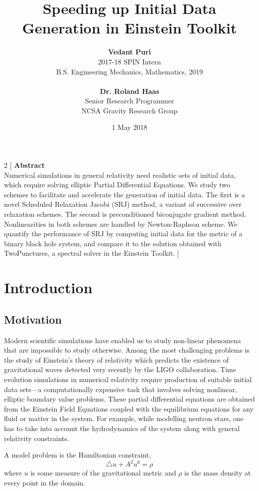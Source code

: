 \documentclass[12pt]{article}
\title{\bf Speeding up Initial Data Generation in Einstein Toolkit}
\author{\textbf{Vedant Puri}\\2017-18 SPIN Intern\\B.S. Engineering Mechanics, Mathematics, 2019
\\\\\textbf{Dr. Roland Haas}\\Senior Research Programmer\\NCSA Gravity Research Group}
\date{1 May 2018}
\begin{document}
\maketitle

\begin{multicols}{2}
[
\textbf{Abstract}\\Numerical simulations in general relativity need realistic sets of initial data, which require solving elliptic Partial Differential Equations. We study two schemes to facilitate and accelerate the generation of initial data. The first is a novel Scheduled Relaxation Jacobi (SRJ) method, a variant of successive over relaxation schemes. The second is preconditioned biconjugate gradient method. Nonlinearities in both schemes are handled by Newton-Raphson scheme. We quantify the performance of SRJ by computing initial data for the metric of a binary black hole system, and compare it to the solution obtained with TwoPunctures, a spectral solver in the Einstein Toolkit.
]

\section{Introduction}

\subsection{Motivation}
Modern scientific simulations have enabled us to study non-linear phenomena that are impossible to study otherwise. Among the most challenging problems is the study of Einstein's theory of relativity which predicts the existence of gravitational waves detected very recently by the LIGO collaboration. Time evolution simulations in numerical relativity require production of suitable initial data sets---a computationally expensive task that involves solving nonlinear, elliptic boundary value problems. These partial differential equations are obtained from the Einstein Field Equations coupled with the equilibrium equations for any fluid or matter in the system. For example, while modelling neutron stars, one has to take into account the hydrodynamics of the system along with general relativity constraints.

A model problem is the Hamiltonian constraint,
\begin{equation}
    \triangle u + A^2u^8 = \rho
\end{equation}
where $u$ is some measure of the gravitational metric and $\rho$ is the mass density at every point in the domain.


\end{multicols}
\end{document}
